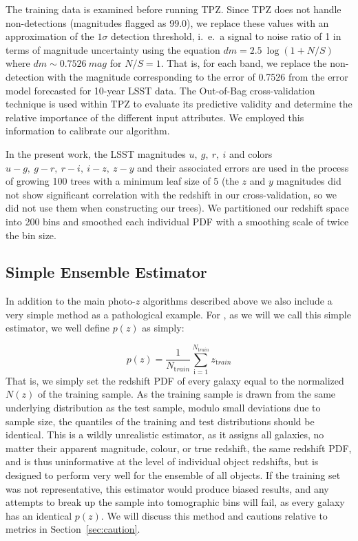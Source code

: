 The training data is examined before running TPZ. Since TPZ does not handle non-detections (magnitudes flagged as 99.0), we replace these values with an approximation of the $1\sigma$ detection threshold, i.~e.~a signal to noise ratio of 1 in terms of magnitude uncertainty using the equation $dm = 2.5 ~ \log ( 1 + N/S )$ where $dm \sim 0.7526 ~ mag$ for $N/S=1$.  That is, for each band, we replace the non-detection with the magnitude corresponding to the error of 0.7526 from the error model forecasted for 10-year LSST data. The Out-of-Bag \citep{Breiman:84,Carrasco_Kind:13} cross-validation technique is used within TPZ to evaluate its predictive validity and determine the relative importance of the different input attributes. We employed this information to calibrate our algorithm.

In the present work, the LSST magnitudes $u,~g,~r,~i$ and colors $u-g,~g-r,~r-i,~i-z,~z-y$ and their associated errors are used in the process of growing 100 trees with a minimum leaf size of 5 (the $z$ and $y$ magnitudes did not show significant correlation with the redshift in our cross-validation, so we did not use them when constructing our trees). We partitioned our redshift space into 200 bins and smoothed each individual PDF with a smoothing scale of twice the bin size.

\subsection{Simple Ensemble Estimator}\label{sec:method:trainz}
In addition to the main photo-$z$ algorithms described above we also include a very simple method as a pathological example.  For \trainz, as we will we call this simple estimator, we well define $p(z)$ as simply:

\begin{equation}
p(z) = \frac{1}{N_{ \mathrm train}}\sum_{\mathrm i=1}^{N_{\mathrm train}}z_{\mathrm train}
\end{equation}
That is, we simply set the redshift PDF of every galaxy equal to the normalized $N(z)$ of the training sample.  As the training sample is drawn from the same underlying distribution as the test sample, modulo small deviations due to sample size, the quantiles of the training and test distributions should be identical.  This is a wildly unrealistic estimator, as it assigns all galaxies, no matter their apparent magnitude, colour, or true redshift, the same redshift PDF, and is thus uninformative at the level of individual object redshifts, but is designed to perform very well for the ensemble of all objects.  If the training set was not representative, this estimator would produce biased results, and any attempts to break up the sample into tomographic bins will fail, as every galaxy has an identical $p(z)$.  We will discuss this method and cautions relative to metrics in Section~\ref{sec:caution}.
